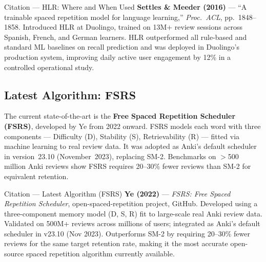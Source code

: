 \documentclass[10pt,a4paper]{article}
\begin{document}
\begin{citationbox}{Citation --- HLR: Where and When Used}
\textbf{Settles \& Meeder (2016)} --- ``A trainable spaced repetition model for language learning,'' \emph{Proc.\ ACL}, pp.\ 1848--1858. Introduced HLR at Duolingo, trained on 13M+ review sessions across Spanish, French, and German learners. HLR outperformed all rule-based and standard ML baselines on recall prediction and was deployed in Duolingo's production system, improving daily active user engagement by 12\% in a controlled operational study.
\end{citationbox}

\subsection{Latest Algorithm: FSRS}
The current state-of-the-art is the \textbf{Free Spaced Repetition Scheduler (FSRS)}, developed by Ye \cite{ye2022fsrs} from 2022 onward. FSRS models each word with three components --- Difficulty (D), Stability (S), Retrievability (R) --- fitted via machine learning to real review data. It was adopted as Anki's default scheduler in version~23.10 (November~2023), replacing SM-2. Benchmarks on $>$500 million Anki reviews show FSRS requires 20--30\% fewer reviews than SM-2 for equivalent retention.

\begin{citationbox}{Citation --- Latest Algorithm (FSRS)}
\textbf{Ye (2022)} --- \emph{FSRS: Free Spaced Repetition Scheduler}, open-spaced-repetition project, GitHub. Developed using a three-component memory model (D, S, R) fit to large-scale real Anki review data. Validated on 500M+ reviews across millions of users; integrated as Anki's default scheduler in v23.10 (Nov 2023). Outperforms SM-2 by requiring 20--30\% fewer reviews for the same target retention rate, making it the most accurate open-source spaced repetition algorithm currently available.
\end{citationbox}
\end{document}
